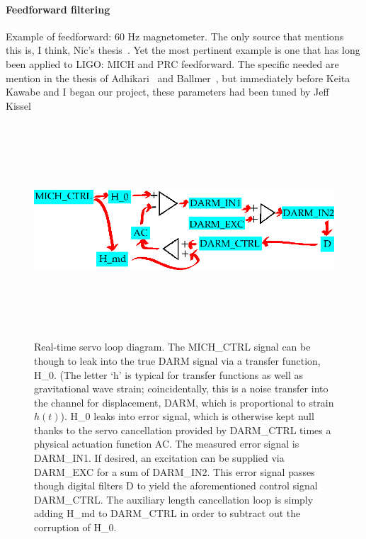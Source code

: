                 \paragraph{Feedforward filtering}
                \label{feedforward_filters}

                    Example of feedforward: 60 Hz magnetometer. The only source that mentions this is, I think, Nic's thesis~\cite{SmithThesis}. Yet the most pertinent example is one that has long been applied to LIGO: MICH and PRC feedforward. The specific needed are mention in the thesis of Adhikari~\cite{AdhikariThesis} and Ballmer~\cite{BallmerThesis}, but immediately before Keita Kawabe and I began our project, these parameters had been tuned by Jeff Kissel~\cite{KissellPRCMICH}

	\begin{figure}
	\begin{center}
	\includegraphics[height=80mm, width=148mm]{servo_loop.eps}
	\caption{Real-time servo loop diagram. The MICH\_CTRL signal can be though to leak into the true DARM signal via a transfer function, H\_0. (The letter `h' is typical for transfer functions as well as gravitational wave strain; coincidentally, this is a noise transfer into the channel for displacement, DARM, which is proportional to strain $h(t)$). H\_0 leaks into error signal, which is otherwise kept null thanks to the servo cancellation provided by DARM\_CTRL times a physical actuation function AC. The measured error signal is DARM\_IN1. If desired, an excitation can be supplied via DARM\_EXC for a sum of DARM\_IN2. This error signal passes though digital filters D to yield the aforementioned control signal DARM\_CTRL. The auxiliary length cancellation loop is simply adding H\_md to DARM\_CTRL in order to subtract out the corruption of H\_0.}
	\label{servo_loop_realtime}
	\end{center}
	\end{figure}

